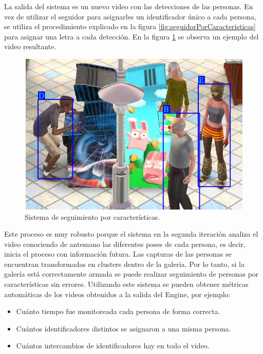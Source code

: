 La salida del sistema es un nuevo video con las detecciones de las personas. En vez de utilizar el seguidor para asignarles un identificador único a cada persona, se utiliza el procedimiento explicado en la figura \ref{fig:seguidorPorCaracteristicas} para asignar una letra a cada detección. En la figura \ref{fig:videoPorCaracteristicas} se observa un ejemplo del video resultante.

\begin{figure}[ht]
	\centering
	\includegraphics[scale=.60]{./Figures/videoPorCaracteristicas.jpg}
	\caption{Sistema de seguimiento por características.}
	\label{fig:videoPorCaracteristicas}
\end{figure}

Este proceso es muy robusto porque el sistema en la segunda iteración analiza el video conociendo de antemano las diferentes poses de cada persona, es decir, inicia el proceso con información futura. Las capturas de las personas se encuentran transformadas en clusters dentro de la galería. Por lo tanto, si la galería está correctamente armada se puede realizar seguimiento de personas por características sin errores. Utilizando este sistema se pueden obtener métricas automáticas de los videos obtenidos a la salida del Engine, por ejemplo:
\begin{itemize}
\item Cuánto tiempo fue monitoreada cada persona de forma correcta.
\item Cuántos identificadores distintos se asignaron a una misma persona.
\item Cuántos intercambios de identificadores hay en todo el video.
\end{itemize}

